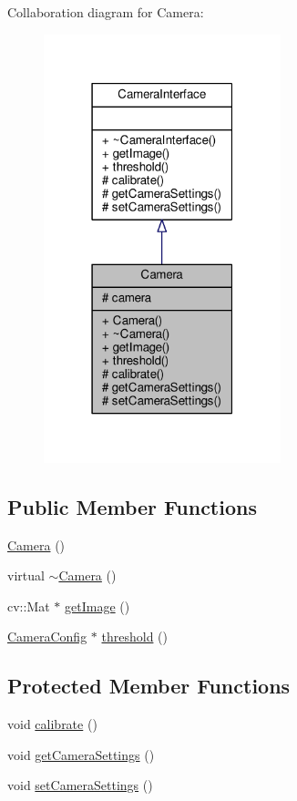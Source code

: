 Collaboration diagram for Camera\+:\nopagebreak
\begin{figure}[H]
\begin{center}
\leavevmode
\includegraphics[width=195pt]{class_camera__coll__graph}
\end{center}
\end{figure}
\subsection*{Public Member Functions}
\begin{DoxyCompactItemize}
\item 
\hyperlink{class_camera_a01f94c3543f56ede7af49dc778f19331}{Camera} ()
\item 
virtual \hyperlink{class_camera_ad1897942d0ccf91052386388a497349f}{$\sim$\+Camera} ()
\item 
cv\+::\+Mat $\ast$ \hyperlink{class_camera_a45c96b9b33d73f3a5af527de0a5b6526}{get\+Image} ()
\item 
\hyperlink{class_camera_config}{Camera\+Config} $\ast$ \hyperlink{class_camera_ad4553e7cd83dba29a3d0b1542e28c66e}{threshold} ()
\end{DoxyCompactItemize}
\subsection*{Protected Member Functions}
\begin{DoxyCompactItemize}
\item 
void \hyperlink{class_camera_aff4f0478ef6ed7b35f353a6d055f0481}{calibrate} ()
\item 
void \hyperlink{class_camera_a62e9e0757dc2758b118274cfa5d56ff6}{get\+Camera\+Settings} ()
\item 
void \hyperlink{class_camera_afc0e7093a6749fa1445545cd59fca7b0}{set\+Camera\+Settings} ()
\end{DoxyCompactItemize}
